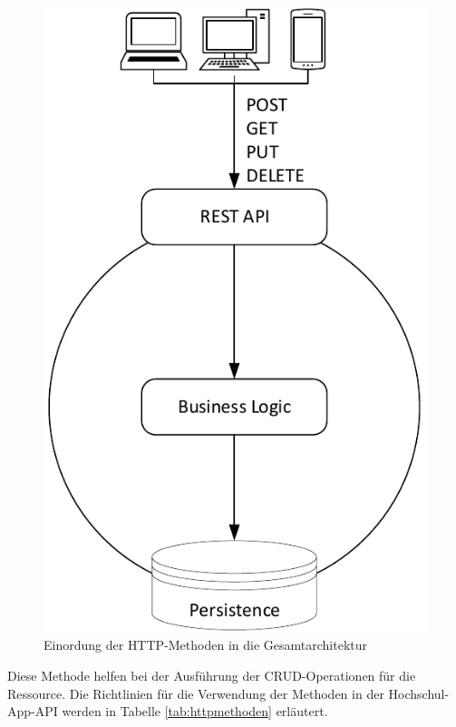 \begin{figure}[H]
\centering
\includegraphics[width=\pictureWidth cm - 7.5 cm]{Bilder/Sonstiges/Rest_Api_HTTP.pdf}
\caption{Einordung der \ac{HTTP}-Methoden in  die Gesamtarchitektur\label{fig:api}\protect\footnotemark}
\end{figure}


Diese Methode helfen bei der Ausführung der \ac{CRUD}-Operationen für die Ressource. Die Richtlinien für die Verwendung der Methoden in der Hochschul-\ac{App}-\ac{API} werden in Tabelle \ref{tab:httpmethoden} erläutert\autocite[Vgl.][]{httpwiki}.


